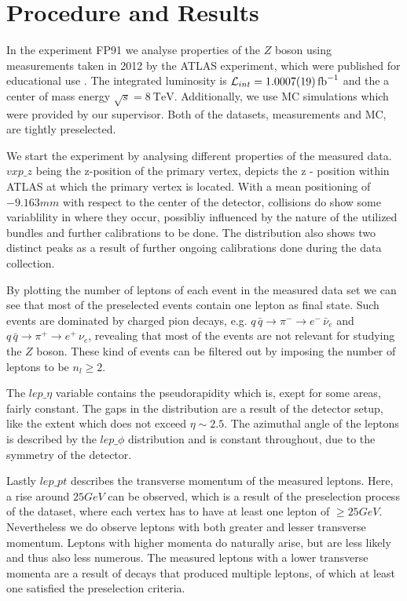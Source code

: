 \documentclass[11 pt]{article}
\begin{document}
\section{Procedure and Results}
In the experiment FP91 we analyse properties of the $Z$ boson using measurements taken in 2012 by the ATLAS experiment, which were published for educational use \footnotemark {} \footnotemark {}. The integrated luminosity is $\mathcal{L}_{int} = \SI{1.0007\pm 0.0019}{\femto\barn^{-1}}$ and the a center of mass energy $\sqrt{s} = \SI{8}{\tera\electronvolt}$. Additionally, we use MC simulations which were provided by our supervisor. Both of the datasets, measurements and MC, are tightly preselected.

We start the experiment by analysing different properties of the measured data. $vxp\_z$ being the z-position of the primary vertex, depicts the z - position within ATLAS at which the primary vertex is located. With a mean positioning of $-9.163mm$ with respect to the center of the detector, collisions do show some variablility in where they occur, possibliy influenced by the nature of the utilized bundles and further calibrations to be done. The distribution also shows two distinct peaks as a result of further ongoing calibrations done during the data collection.

By plotting the number of leptons of each event in the measured data set we can see that most of the preselected events contain one lepton as final state. Such events are dominated by charged pion decays, e.g. $q\, \bar{q} \to \pi^- \to e^-\, \bar{\nu}_e$ and $q\, \bar{q} \to \pi^+ \to e^+\, \nu_e$, revealing that most of the events are not relevant for studying the $Z$ boson. These kind of events can be filtered out by imposing the number of leptons to be $n_l \geq 2$. 

The $lep\_\eta$ variable contains the pseudorapidity which is, exept for some areas, fairly constant. The gaps in the distribution are a result of the detector setup, like the extent which does not exceed $\eta \sim 2.5 $.
The azimuthal angle of the leptons is described by the $lep\_\phi$ distribution and is constant throughout, due to the symmetry of the detector.

Lastly $lep\_pt$ describes the transverse momentum of the measured leptons. Here, a rise around $25GeV$ can be observed, which is a result of the preselection process of the dataset, where each vertex has to have at least one lepton of $\geq25GeV$. Nevertheless we do observe leptons with both greater and lesser transverse momentum. Leptons with higher momenta do naturally arise, but are less likely and thus also less numerous. The measured leptons with a lower transverse momenta are a result of decays that produced  multiple leptons, of which at least one satisfied the preselection criteria.
\end{document}
